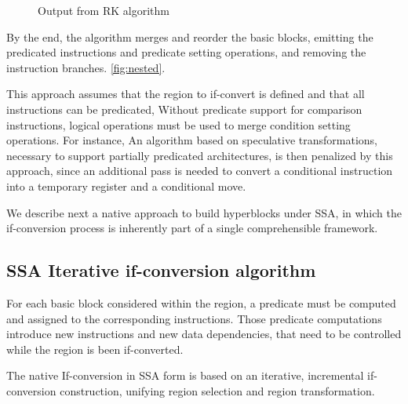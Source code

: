 \begin{figure}
\footnotesize
\caption{Output from RK algorithm}
\label{fig:RK}
\end{figure}

By the end, the algorithm merges and reorder the basic blocks, emitting the predicated instructions and predicate setting operations, and removing the instruction branches. \ref{fig:nested}. 

This approach assumes that the region to if-convert is defined and that all instructions can be predicated, Without predicate support for comparison instructions, logical operations must be used to merge condition setting operations. For instance, An algorithm based on speculative transformations, necessary to support partially predicated architectures, is then penalized by this approach, since an additional pass is needed to convert a conditional instruction into a temporary register and a conditional move.

We describe next a native approach to build hyperblocks under SSA, in which the if-conversion process is inherently part of a single comprehensible framework.

\subsection{SSA Iterative if-conversion algorithm}

For each basic block considered within the region, a predicate must be computed and assigned to the corresponding instructions. Those predicate computations introduce new instructions and new data dependencies, that need to be controlled while the region is been if-converted.

The native If-conversion in SSA form is based on an iterative, incremental if-conversion construction, unifying region selection and region transformation. 

